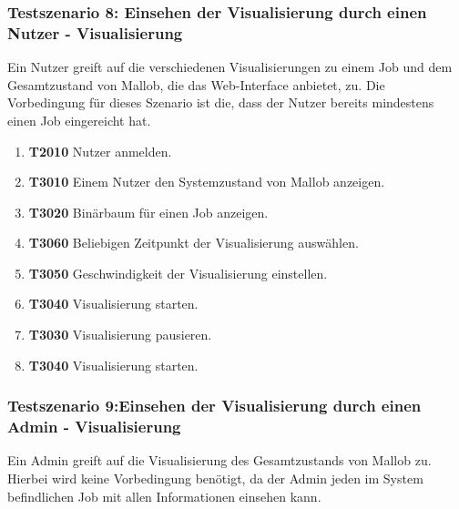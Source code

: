 \subsubsection{Testszenario 8: Einsehen der Visualisierung durch einen Nutzer - Visualisierung}
Ein Nutzer greift auf die verschiedenen Visualisierungen zu einem Job und dem Gesamtzustand von Mallob, die das Web-Interface anbietet, zu. Die Vorbedingung für dieses Szenario ist die, dass der Nutzer bereits mindestens einen Job eingereicht hat.

\begin{enumerate}
    \item \textbf{T2010} Nutzer anmelden.
    
    \item \textbf{T3010} Einem Nutzer den Systemzustand von Mallob anzeigen. 
    
    \item \textbf{T3020} Binärbaum für einen Job anzeigen. 
    
    \item \textbf{T3060} Beliebigen Zeitpunkt der Visualisierung auswählen.
    
    \item \textbf{T3050} Geschwindigkeit der Visualisierung einstellen.
    
    \item \textbf{T3040} Visualisierung starten. 
    
    \item \textbf{T3030} Visualisierung pausieren.

    \item \textbf{T3040} Visualisierung starten. 
\end{enumerate}

\subsubsection{Testszenario 9:Einsehen der Visualisierung durch einen Admin - Visualisierung}
Ein Admin greift auf die Visualisierung des Gesamtzustands von Mallob zu. Hierbei wird keine Vorbedingung benötigt, da der Admin jeden im System befindlichen Job mit allen Informationen einsehen kann.

